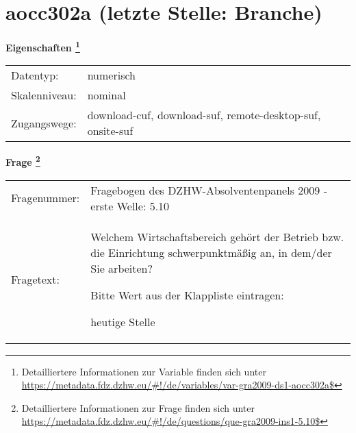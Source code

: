 
    \setcounter{footnote}{0}

    \vspace*{-1.8cm}
	\section{aocc302a (letzte Stelle: Branche)}
	\label{section:aocc302a}



    \vspace*{0.5cm}
    \noindent\textbf{Eigenschaften
	\footnote{Detailliertere Informationen zur Variable finden sich unter
		\url{https://metadata.fdz.dzhw.eu/\#!/de/variables/var-gra2009-ds1-aocc302a$}}}\\
	\begin{tabularx}{\hsize}{@{}lX}
	Datentyp: & numerisch \\
	Skalenniveau: & nominal \\
	Zugangswege: &
	  download-cuf, 
	  download-suf, 
	  remote-desktop-suf, 
	  onsite-suf
 \\
    \end{tabularx}



				\vspace*{0.5cm}
                \noindent\textbf{Frage
	                \footnote{Detailliertere Informationen zur Frage finden sich unter
		              \url{https://metadata.fdz.dzhw.eu/\#!/de/questions/que-gra2009-ins1-5.10$}}}\\
				\begin{tabularx}{\hsize}{@{}lX}
					Fragenummer: &
					  Fragebogen des DZHW-Absolventenpanels 2009 - erste Welle:
					  5.10
 \\
					Fragetext: & Welchem Wirtschaftsbereich gehört der Betrieb bzw. die Einrichtung schwerpunktmäßig an, in dem/der Sie arbeiten?\par  Bitte Wert aus der Klappliste eintragen:\par  heutige Stelle \\
				\end{tabularx}





